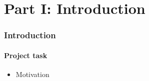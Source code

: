 \section{Part I: Introduction}

\begin{frame}
  \frametitle{Introduction}
  \framesubtitle{Project task}
  \begin{itemize}
    \item Motivation
  \end{itemize}
\end{frame}
